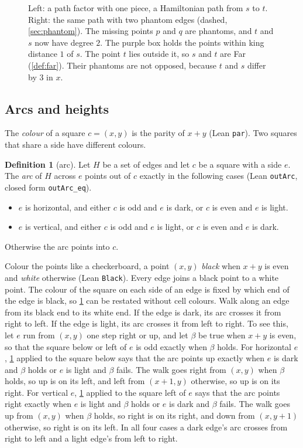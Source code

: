\documentclass[11pt]{article}
\theoremstyle{plain}
\theoremstyle{definition}
\newtheorem{definition}[theorem]{Definition}
\theoremstyle{remark}
\newcommand{\lean}[1]{\texttt{#1}}
\begin{document}
\begin{figure}[t]
\centering

\caption{Left: a path factor with one piece, a Hamiltonian path from $s$ to $t$.
Right: the same path with two phantom edges (dashed, \cref{sec:phantom}).
The missing points $p$ and $q$ are phantoms, and $t$ and $s$ now have degree $2$.
The purple box holds the points within king distance $1$ of $s$.
The point $t$ lies outside it, so $s$ and $t$ are Far (\cref{def:far}).
Their phantoms are not opposed, because $t$ and $s$ differ by $3$ in $x$.}
\label{fig:factor}
\end{figure}

\subsection{Arcs and heights}

The \emph{colour} of a square $c=(x,y)$ is the parity of $x+y$ (Lean \lean{par}).
Two squares that share a side have different colours.

\begin{definition}[arc]
\label{def:arc}
Let $H$ be a set of edges and let $c$ be a square with a side $e$.
The \emph{arc} of $H$ across $e$ points out of $c$ exactly in the following cases (Lean
\lean{outArc}, closed form \lean{outArc\_eq}).
\begin{itemize}
\item $e$ is horizontal, and either $c$ is odd and $e$ is dark, or $c$ is even and $e$ is light.
\item $e$ is vertical, and either $c$ is odd and $e$ is light, or $c$ is even and $e$ is dark.
\end{itemize}
Otherwise the arc points into $c$.
\end{definition}

Colour the points like a checkerboard, a point $(x,y)$ \emph{black} when $x+y$ is even and
\emph{white} otherwise (Lean \lean{Black}).
Every edge joins a black point to a white point.
The colour of the square on each side of an edge is fixed by which end of the edge is black, so
\cref{def:arc} can be restated without cell colours.
Walk along an edge from its black end to its white end.
If the edge is dark, its arc crosses it from right to left.
If the edge is light, its arc crosses it from left to right.
To see this, let $e$ run from $(x,y)$ one step right or up, and let $\beta$ be true when $x+y$ is
even, so that the square below or left of $e$ is odd exactly when $\beta$ holds.
For horizontal $e$, \cref{def:arc} applied to the square below says that the arc points up exactly
when $e$ is dark and $\beta$ holds or $e$ is light and $\beta$ fails.
The walk goes right from $(x,y)$ when $\beta$ holds, so up is on its left, and left from $(x+1,y)$
otherwise, so up is on its right.
For vertical $e$, \cref{def:arc} applied to the square left of $e$ says that the arc points right
exactly when $e$ is light and $\beta$ holds or $e$ is dark and $\beta$ fails.
The walk goes up from $(x,y)$ when $\beta$ holds, so right is on its right, and down from
$(x,y+1)$ otherwise, so right is on its left.
In all four cases a dark edge's arc crosses from right to left and a light edge's from left to
right.
\end{document}
